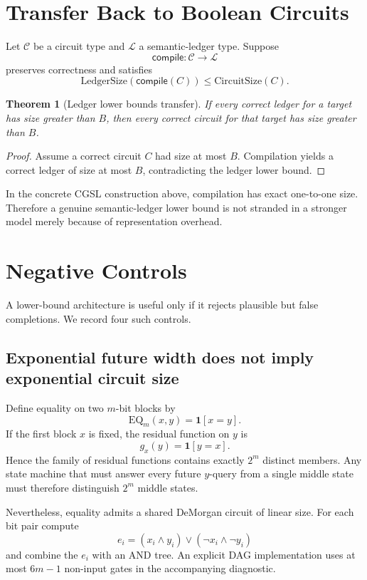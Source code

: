 \documentclass[11pt]{article}
\newtheorem{theorem}{Theorem}[section]
\newcommand{\CircuitSize}{\mathrm{CircuitSize}}
\newcommand{\LedgerSize}{\mathrm{LedgerSize}}
\begin{document}
\section{Transfer Back to Boolean Circuits}

Let $\mathcal C$ be a circuit type and $\mathcal L$ a semantic-ledger type. Suppose
\[
\mathsf{compile}:\mathcal C\to\mathcal L
\]
preserves correctness and satisfies
\[
\LedgerSize(\mathsf{compile}(C))\le\CircuitSize(C).
\]

\begin{theorem}[Ledger lower bounds transfer]
If every correct ledger for a target has size greater than $B$, then every correct circuit for that target has size greater than $B$.
\end{theorem}
\begin{proof}
Assume a correct circuit $C$ had size at most $B$. Compilation yields a correct ledger of size at most $B$, contradicting the ledger lower bound.
\end{proof}

In the concrete CGSL construction above, compilation has exact one-to-one size. Therefore a genuine semantic-ledger lower bound is not stranded in a stronger model merely because of representation overhead.

\section{Negative Controls}

A lower-bound architecture is useful only if it rejects plausible but false completions. We record four such controls.

\subsection{Exponential future width does not imply exponential circuit size}

Define equality on two $m$-bit blocks by
\[
\mathrm{EQ}_m(x,y)=\mathbf 1[x=y].
\]
If the first block $x$ is fixed, the residual function on $y$ is
\[
g_x(y)=\mathbf 1[y=x].
\]
Hence the family of residual functions contains exactly $2^m$ distinct members. Any state machine that must answer every future $y$-query from a single middle state must therefore distinguish $2^m$ middle states.

Nevertheless, equality admits a shared DeMorgan circuit of linear size. For each bit pair compute
\[
e_i=(x_i\wedge y_i)\vee(\neg x_i\wedge\neg y_i)
\]
and combine the $e_i$ with an AND tree. An explicit DAG implementation uses at most $6m-1$ non-input gates in the accompanying diagnostic.
\end{document}
